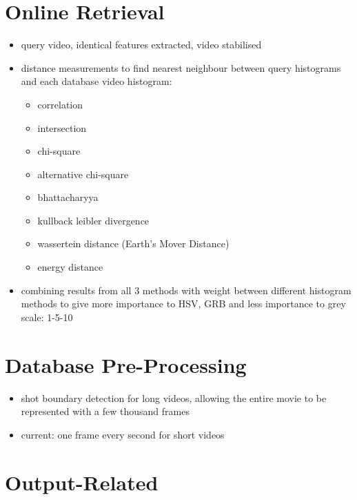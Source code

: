 \section{Online Retrieval}

\begin{itemize}
    \item query video, identical features extracted, video stabilised
    \item distance measurements to find nearest neighbour between query histograms and each database video histogram:
        \begin{itemize}
            \item correlation
            \item intersection
            \item chi-square
            \item alternative chi-square
            \item bhattacharyya
            \item kullback leibler divergence
            \item wassertein distance (Earth's Mover Distance)
            \item energy distance
        \end{itemize}
    \item combining results from all 3 methods with weight between different histogram methods to give more importance to HSV, GRB and less importance to grey scale: 1-5-10
\end{itemize}

\section{Database Pre-Processing}

\begin{itemize}
    \item shot boundary detection for long videos, allowing the entire movie to be represented with a few thousand frames
    \item current: one frame every second for short videos
\end{itemize}

\section{Output-Related}

